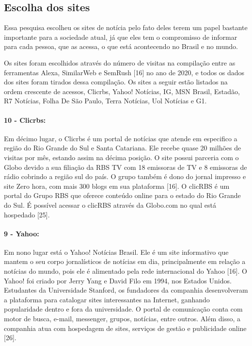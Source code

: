 \documentclass[a4paper]{article}
\begin{document}
\begin{titlepage}
\subsection{Escolha dos sites}

Essa pesquisa escolheu os sites de notícia pelo fato deles terem um papel bastante importante para a sociedade atual, já que eles tem o compromisso de informar para cada pessoa, que as acessa, o que está acontecendo no Brasil e no mundo.

Os sites foram escolhidos através do número de visitas na compilação entre as ferramentas Alexa, SimilarWeb e SemRush [16] no ano de 2020, e todos os dados dos sites foram tirados dessa compilação. Os sites a seguir estão listados na ordem crescente de acessos, Clicrbs, Yahoo! Notícias, IG, MSN Brasil, Estadão, R7 Notícias, Folha De São Paulo, Terra Notícias, Uol Notícias e G1.

\paragraph{10 - Clicrbs: }

Em décimo lugar, o Clicrbs é um portal de notícias que atende em especifico a região do Rio Grande do Sul e Santa Catariana. Ele recebe quase 20 milhões de visitas por mês, estando assim na décima posição. O site possui parceria com o Globo devido a sua filiação da RBS TV com 18 emissoras de TV e 8 emissoras de rádio cobrindo a região sul do país. O grupo também é dono do jornal impresso e site Zero hora, com mais 300 blogs em sua plataforma [16]. O clicRBS é um portal do Grupo RBS que oferece conteúdo online para o estado do Rio Grande do Sul. É possível acessar o clicRBS através da Globo.com no qual está hospedado [25].

\paragraph{9 - Yahoo: }

Em nono lugar está o Yahoo! Notícias Brasil. Ele é um site informativo que mantem o seu corpo jornalísticos de notícias em dia, principalmente em relação a notícias do mundo, pois ele é alimentado pela rede internacional do Yahoo [16]. O Yahoo! foi criado por Jerry Yang e David Filo em 1994, nos Estados Unidos. Estudantes da Universidade Stanford, os fundadores da companhia desenvolveram a plataforma para catalogar sites interessantes na Internet, ganhando popularidade dentro e fora da universidade. O portal de comunicação conta com motor de busca, e-mail, messenger, grupos, notícias, entre outros. Além disso, a companhia atua com hospedagem de sites, serviços de gestão e publicidade online [26].


\end{titlepage}
\end{document}
